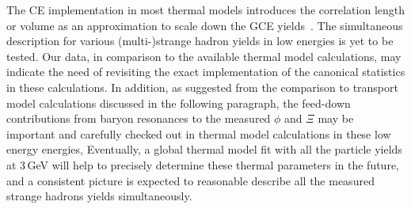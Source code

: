 \documentclass[aps,tightenlines,superscriptaddress,twocolumn]{revtex4-1}
\begin{document}
The CE implementation in most thermal models introduces the correlation length or volume as an approximation to scale down the GCE yields~\cite{BraunMunzinger:2003zd,THERMUS_WHEATON200984}. The simultaneous description for various (multi-)strange hadron yields in low energies is yet to be tested. Our data, in comparison to the available thermal model calculations, may indicate the need of revisiting the exact implementation of the canonical statistics in these calculations. In addition, as suggested from the comparison to transport model calculations discussed in the following paragraph, the feed-down contributions from baryon resonances to the measured $\phi$ and $\Xi$ may be important and carefully checked out in thermal model calculations in these low energy energies, 
Eventually, a global thermal model fit with all the particle yields at 3\,GeV will help to precisely determine these thermal parameters in the future, and a consistent picture is expected to reasonable describe all the measured strange hadrons yields simultaneously. 
\end{document}
